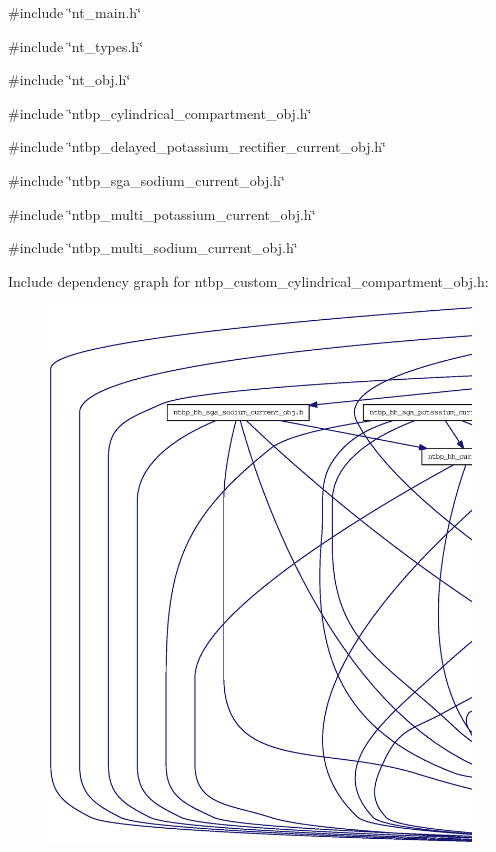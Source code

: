 {\ttfamily \#include \char`\"{}nt\_\-main.h\char`\"{}}\par
{\ttfamily \#include \char`\"{}nt\_\-types.h\char`\"{}}\par
{\ttfamily \#include \char`\"{}nt\_\-obj.h\char`\"{}}\par
{\ttfamily \#include \char`\"{}ntbp\_\-cylindrical\_\-compartment\_\-obj.h\char`\"{}}\par
{\ttfamily \#include \char`\"{}ntbp\_\-delayed\_\-potassium\_\-rectifier\_\-current\_\-obj.h\char`\"{}}\par
{\ttfamily \#include \char`\"{}ntbp\_\-sga\_\-sodium\_\-current\_\-obj.h\char`\"{}}\par
{\ttfamily \#include \char`\"{}ntbp\_\-multi\_\-potassium\_\-current\_\-obj.h\char`\"{}}\par
{\ttfamily \#include \char`\"{}ntbp\_\-multi\_\-sodium\_\-current\_\-obj.h\char`\"{}}\par
Include dependency graph for ntbp\_\-custom\_\-cylindrical\_\-compartment\_\-obj.h:
\nopagebreak
\begin{figure}[H]
\begin{center}
\leavevmode
\includegraphics[width=400pt]{ntbp__custom__cylindrical__compartment__obj_8h__incl}
\end{center}
\end{figure}
